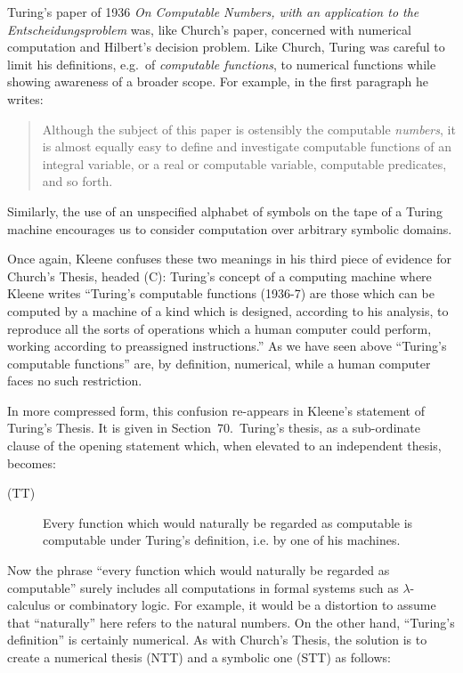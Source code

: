 \documentclass[a4paper]{article}
\begin{document}
Turing's paper of 1936 {\em On Computable Numbers, with an application
  to the Entscheidungsproblem} was, like Church's paper, concerned
with numerical computation and Hilbert's decision problem. Like
Church, Turing was careful to limit his definitions, e.g.\ of {\em
  computable functions}, to numerical functions while showing
awareness of a broader scope. For example, in the first paragraph he
writes:
\begin{quote}
  Although the subject of this paper is ostensibly the computable {\em
    numbers}, it is almost equally easy to define and investigate
  computable functions of an integral variable, or a real or
  computable variable, computable predicates, and so
    forth.
\end{quote}
Similarly, the use of an unspecified
  alphabet of symbols on the tape of a Turing machine encourages us to
  consider computation over arbitrary symbolic domains.

Once again, Kleene confuses these two meanings in his third piece of
evidence for Church's Thesis, headed (C): Turing's concept of a
computing machine \cite[page 320]{Kleene52} where Kleene writes
``Turing's computable functions (1936-7) are those which can be
computed by a machine of a kind which is designed, according to his
analysis, to reproduce all the sorts of operations which a human
computer could perform, working according to preassigned
instructions.'' As we have seen above ``Turing's computable
functions'' are, by definition, numerical, while a human computer
faces no such restriction.

In more compressed form, this confusion re-appears in Kleene's
statement of Turing's Thesis. It is given in
Section~70.\ Turing's thesis, as a sub-ordinate clause of the opening
statement which, when elevated to an independent thesis, becomes:



\begin{description}
\item[(TT)]
  Every function which would naturally be regarded as computable is  
  computable under Turing's definition, i.e. by one of   his machines.
\end{description}

\noindent
Now the phrase ``every function which would naturally be regarded as
computable'' surely includes all computations in formal systems such
as $\lambda$-calculus or combinatory logic. For example, it would be a
distortion to assume that ``naturally'' here refers to the natural
numbers. On the other hand, ``Turing's definition'' is certainly numerical. 
As with Church's Thesis, the solution is to create a numerical thesis
(NTT) and a symbolic one (STT) as follows:
\end{document}
